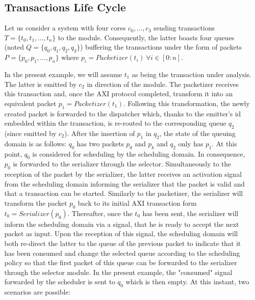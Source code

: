\subsection{Transactions Life Cycle}
\label{subsec:transaction-life-cycle}

Let us consider a system with four cores $c_0, \ldots, c_3$ sending
transactions $T = \{t_{0}, t_{1}, ..., t_{n}\}$ to the \schim module.
Consequently, the latter boasts four queues (noted $Q = \{q_{0},
q_{1}, q_{2}, q_{3}\}$) buffering the transactions under the form of
packets $P = \{p_{0}, p_{1}, ..., p_{n}\}$ where $p_{i} =
Packetizer(t_{i})~\forall i \in [0 : n]$.

In the present example, we will assume $t_{1}$ as being the
transaction under analysis.  The latter is emitted by $c_{2}$ in
direction of the \schim module.  The packetizer receives this
transaction and, once the AXI protocol completed, transform it into an
equivalent packet $p_{1} = Packetizer(t_{1})$.  Following this
transformation, the newly created packet is forwarded to the
dispatcher which, thanks to the emitter's id embedded within the
transaction, is re-routed to the corresponding queue $q_{2}$ (since
emitted by $c_{2}$).  After the insertion of $p_{1}$ in $q_{2}$, the
state of the queuing domain is as follows: $q_{0}$ has two packets
$p_{0}$ and $p_{k}$ and $q_{2}$ only has $p_{1}$.  At this point,
$q_{0}$ is considered for scheduling by the scheduling domain.  In
consequence, $p_{0}$ is forwarded to the serializer through the
selector.  Simultaneously to the reception of the packet by the
serializer, the latter receives an activation signal from the
scheduling domain informing the serializer that the packet is valid
and that a transaction can be started.  Similarly to the packetizer,
the serializer will transform the packet $p_{0}$ back to its initial
AXI transaction form $t_{0} = Serializer(p_{0})$.  Thereafter, once
the $t_{0}$ has been sent, the serializer will inform the scheduling
domain via a signal, that he is ready to accept the next packet as
input.  Upon the reception of this signal, the scheduling domain will
both re-direct the latter to the queue of the previous packet to
indicate that it has been consumed and change the selected queue
according to the scheduling policy so that the first packet of this
queue can be forwarded to the serializer through the selector module.
In the present example, the "consumed" signal forwarded by the
scheduler is sent to $q_{0}$ which is then empty.  At this instant,
two scenarios are possible:

